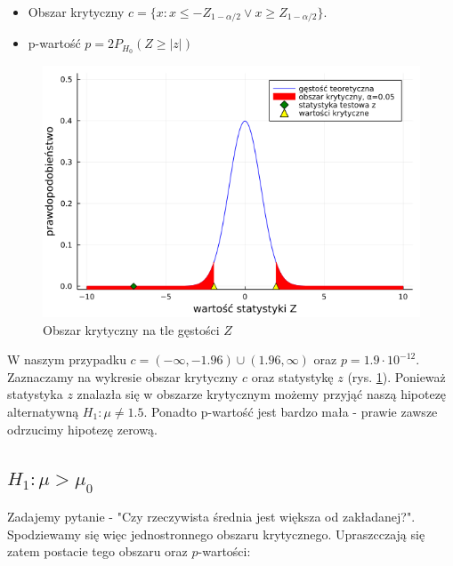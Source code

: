 \documentclass{article}
\theoremstyle{break}
\begin{document}
	\begin{itemize}
		\item Obszar krytyczny $c=\{x: x\leq -Z_{1-\alpha/2} \lor x\geq Z_{1-\alpha/2}\}$.
		\item p-wartość $p=2P_{H_0}(Z\geq|z|)$
	\end{itemize}
\begin{figure}[H]
	\begin{center}
		\includegraphics[scale=0.5]{Z1.1.png}
		\caption{Obszar krytyczny na tle gęstości $Z$}
		\label{fig:1}
	\end{center}
\end{figure}
	W naszym przypadku $c=(-\infty,-1.96)\cup (1.96,\infty)$ oraz $p=1.9\cdot 10^{-12}$.\\
	Zaznaczamy na wykresie obszar krytyczny  $c$ oraz statystykę $z$ (rys. \ref{fig:1}). Ponieważ statystyka $z$ znalazła się w obszarze krytycznym możemy przyjąć naszą hipotezę alternatywną $H_1: \mu \ne 1.5$. Ponadto p-wartość jest bardzo mała - prawie zawsze odrzucimy hipotezę zerową.

\newpage
\subsection{$H_1: \mu > \mu_0$}	

Zadajemy pytanie - "Czy rzeczywista średnia jest większa od zakładanej?". Spodziewamy się więc jednostronnego obszaru krytycznego. Upraszcczają się zatem postacie tego obszaru oraz $p$-wartości:
\end{document}
